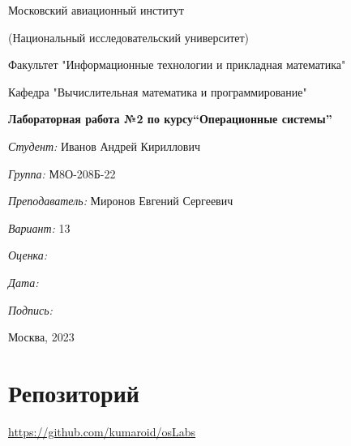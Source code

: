 \documentclass[a4paper, 12pt]{article}
\begin{document}
\thispagestyle{empty}	
\begin{center}
	Московский авиационный институт
	
	(Национальный исследовательский университет)
	
	Факультет "Информационные технологии и прикладная математика"
	
	Кафедра "Вычислительная математика и программирование"
	
\end{center}
\vspace{40ex}
\begin{center}
	\textbf{\large{Лабораторная работа №2 по курсу\linebreak \textquotedblleft Операционные системы\textquotedblright}}
\end{center}
\vspace{35ex}
\begin{flushright}
	\textit{Студент: } Иванов Андрей Кириллович
	
	\vspace{2ex}
	\textit{Группа: } М8О-208Б-22
	
	\vspace{2ex}
	\textit{Преподаватель: } Миронов Евгений Сергеевич
	
	\vspace{2ex}
	\textit{Вариант: } 13
	
	\vspace{2ex}
	\textit{Оценка: } \underline{\quad\quad\quad\quad\quad\quad}
	
	 \vspace{2ex}
	\textit{Дата: } \underline{\quad\quad\quad\quad\quad\quad}
	
	\vspace{2ex}
	\textit{Подпись: } \underline{\quad\quad\quad\quad\quad\quad}
	
\end{flushright}

\vspace{5ex}

\begin{vfill}
	\begin{center}
		Москва, 2023
	\end{center}	
\end{vfill}
\newpage


\begingroup
\color{black}
\tableofcontents\newpage
\endgroup

\section{Репозиторий}
\href{https://github.com/kumaroid/osLabs}{https://github.com/kumaroid/osLabs}
\end{document}
